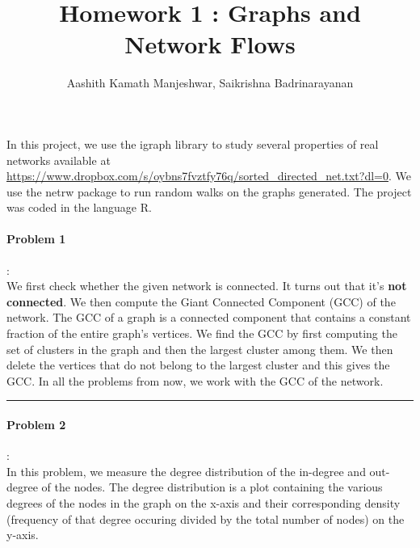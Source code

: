 \documentclass{article}
\title{Homework 1 : Graphs and Network Flows}
\author{Aashith Kamath Manjeshwar, Saikrishna Badrinarayanan}
\begin{document}
\maketitle

In this project, we use the igraph library to study several properties of 
real networks available at \url{https://www.dropbox.com/s/oybns7fvztfy76q/sorted_directed_net.txt?dl=0}. We use 
the netrw package to run random walks on the graphs
generated. The project was coded in the language R.

\paragraph{Problem 1}: \\
We first check whether the given network is connected. It turns out that it's \textbf{not connected}.
We then compute the Giant Connected Component (GCC) of the network. The GCC of a graph is
a connected component that contains a constant fraction of the entire graph’s
vertices. We find the GCC by first computing the set of clusters in the graph
and then the largest cluster among them. We then delete the vertices that do
not belong to the largest cluster and this gives the GCC. In all the problems from now, we work 
with the GCC of the network.\\

\hrule

\paragraph{Problem 2}:\\
In this problem, we measure the degree distribution of the in-degree and out-degree of the nodes.
The degree distribution is a plot containing the various degrees of the nodes in the graph on the x-axis
and their corresponding density (frequency of that degree occuring divided by the total number of nodes) on the y-axis.\\
\pagebreak
\end{document}
